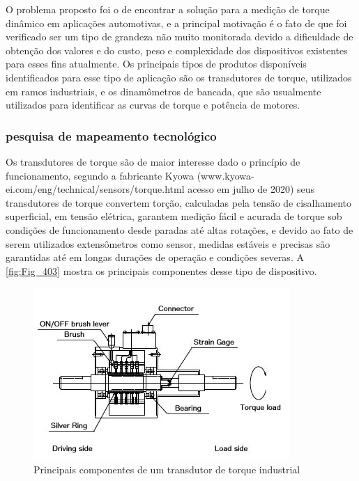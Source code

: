 O problema proposto foi o de encontrar a solução para a medição de torque dinâmico em aplicações automotivas, e a principal motivação é o fato de que foi verificado ser um tipo de grandeza não muito monitorada devido a dificuldade de obtenção dos valores e do custo, peso e complexidade dos dispositivos existentes para esses fins atualmente. Os principais tipos de produtos disponíveis identificados para esse tipo de aplicação são os transdutores de torque, utilizados em ramos industriais, e os dinamômetros de bancada, que são usualmente utilizados para identificar as curvas de torque e potência de motores.

\subsubsection[]{pesquisa de mapeamento tecnológico}

Os transdutores de torque são de maior interesse dado o princípio de funcionamento, segundo a fabricante Kyowa (www.kyowa-ei.com/eng/technical/sensors/torque.html acesso em julho de 2020) seus transdutores de torque convertem torção, calculadas pela tensão de cisalhamento superficial, em tensão elétrica, garantem medição fácil e acurada de torque sob condições de funcionamento desde paradas até altas rotações, e devido ao fato de serem utilizados extensômetros como sensor, medidas estáveis e precisas são garantidas até em longas durações de operação e condições severas. A \autoref{fig:Fig_403} mostra os principais componentes desse tipo de dispositivo.

\begin{figure}[htb]
	\caption{\label{fig:Fig_403}Principais componentes de um transdutor de torque industrial}
	\begin{center}
		\includegraphics{images/img403.jpg}
	\end{center}
\end{figure}

